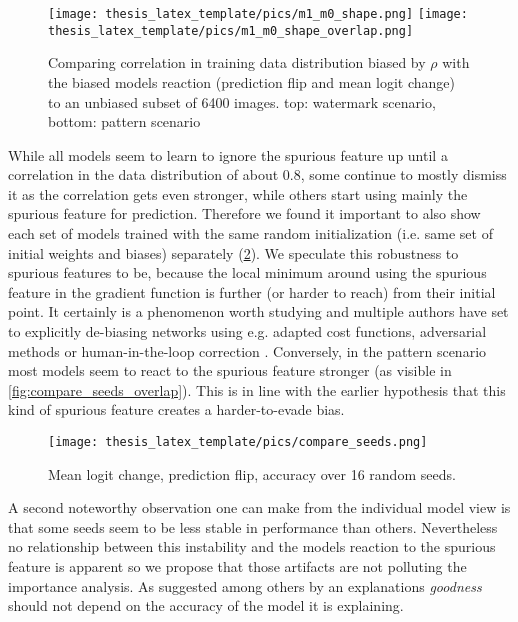 \begin{figure}[t!]
\centering
    \texttt{[image: thesis\_latex\_template/pics/m1\_m0\_shape.png]}
    \texttt{[image: thesis\_latex\_template/pics/m1\_m0\_shape\_overlap.png]}
    \caption[$m_0$ vs. $m_1$]{Comparing correlation in training data distribution biased by $\rho$ with the biased models reaction (prediction flip and mean logit change) to an unbiased subset of 6400 images. top: watermark scenario, bottom: pattern scenario }
    \label{fig:m0_m1}
\end{figure}

While all models seem to learn to ignore the spurious feature up until a correlation in the data distribution of about 0.8, some continue to mostly dismiss it as the correlation gets even stronger, while others start using mainly the spurious feature for prediction. Therefore we found it important to also show each set of models trained with the same random initialization (i.e. same set of initial weights and biases) separately (\cref{fig:gt_over_seeds}). We speculate this robustness to spurious features to be, because the local minimum around using the spurious feature in the gradient function is further (or harder to reach) from their initial point. It certainly is a phenomenon worth studying and multiple authors have set to explicitly de-biasing networks using e.g. adapted cost functions, adversarial methods or human-in-the-loop correction \citep{Anders2022,Pahde2023,Reimers2021, Reimers2021b, Dreyer2023a}.
Conversely, in the pattern scenario most models seem to react to the spurious feature stronger (as visible in \cref{fig:compare_seeds_overlap}). This is in line with the earlier hypothesis that this kind of spurious feature creates a harder-to-evade bias.  

\begin{figure}[t!]
    \centering
    \texttt{[image: thesis\_latex\_template/pics/compare\_seeds.png]}
    \caption[Comparing Seeds]{Mean logit change, prediction flip, accuracy over 16 random seeds.
    }
    \label{fig:gt_over_seeds}
\end{figure}

A second noteworthy observation one can make from the individual model view is that some seeds seem to be less stable in performance than others. Nevertheless no relationship between this instability and the models reaction to the spurious feature is apparent so we propose that those artifacts are not polluting the importance analysis. As suggested among others by \citet{Karimi2023} an explanations \textit{goodness} should not depend on the accuracy of the model it is explaining. 

